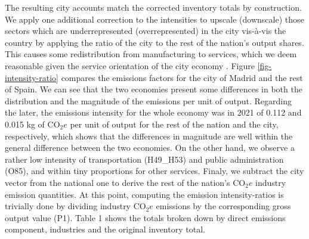 \documentclass[
  10pt,
  twocolumn]{aft}
\begin{document}
The resulting city accounts match the corrected inventory totals by
construction. We apply one additional correction to the intensities to
upscale (downscale) those sectors which are underrepresented
(overrepresented) in the city vis-à-vis the country by applying the
ratio of the city to the rest of the nation's output shares. This causes
some redistribution from manufacturing to services, which we deem
reasonable given the service orientation of the city economy
\citep{amMadridEconomia20232023}. Figure \ref{fig-intensity-ratio}
compares the emissions factors for the city of Madrid and the rest of
Spain. We can see that the two economies present some differences in
both the distribution and the magnitude of the emissions per unit of
output. Regarding the later, the emissions intensity for the whole
economy was in 2021 of 0.112 and 0.015 kg of \(\text{CO}_2e\) per unit
of output for the rest of the nation and the city, respectively, which
shows that the differences in magnitude are well within the general
difference between the two economies. On the other hand, we observe a
rather low intensity of transportation (H49\_H53) and public
administration (O85), and within tiny proportions for other services.
Finaly, we subtract the city vector from the national one to derive the
rest of the nation's \(\text{CO}_2e\) industry emission quantities. At
this point, computing the emission intensity-ratios is trivially done by
dividing industry \(\text{CO}_2e\) emissions by the corresponding gross
output value (P1). Table 1 shows the totals broken down by direct
emissions component, industries and the original inventory total.
\end{document}
